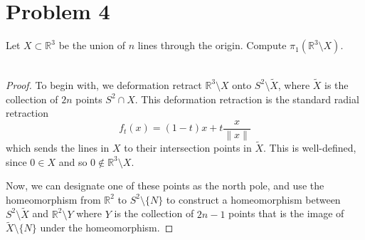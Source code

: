 \documentclass[fontsize=11pt]{scrartcl} %
\numberwithin{equation}{section} %
\numberwithin{figure}{section} %
\numberwithin{table}{section} %
\newcommand{\R}{\mathbb{R}}
\begin{document}
\newpage
\section*{Problem 4}
Let $X\subset \R^3$ be the union of $n$ lines through the origin. Compute
$\pi_1(\R^3\setminus X)$.
\\
\\
\begin{proof}
    To begin with, we deformation retract $\R^3\setminus X$ onto
    $S^2\setminus\tilde{X}$, where $\tilde{X}$ is the collection of $2n$ points
    $S^2\cap X$. This deformation retraction is the standard radial retraction
    \[
        f_t(x) = (1-t)x + t\frac{x}{\|x\|}
    \]
    which sends the lines in $X$ to their intersection points in
    $\tilde{X}$. This is well-defined, since $0\in X$ and so $0\not\in
    \R^3\setminus X$.

    Now, we can designate one of these points as the north pole, and use the
    homeomorphism from $\R^2$ to $S^2\setminus \{N\}$ to construct a
    homeomorphism between $S^2\setminus \tilde{X}$ and $\R^2\setminus Y$ where
    $Y$ is the collection of $2n-1$ points that is the image of
    $\tilde{X}\setminus \{N\}$ under the homeomorphism.


\end{proof}

\newpage
\end{document}
